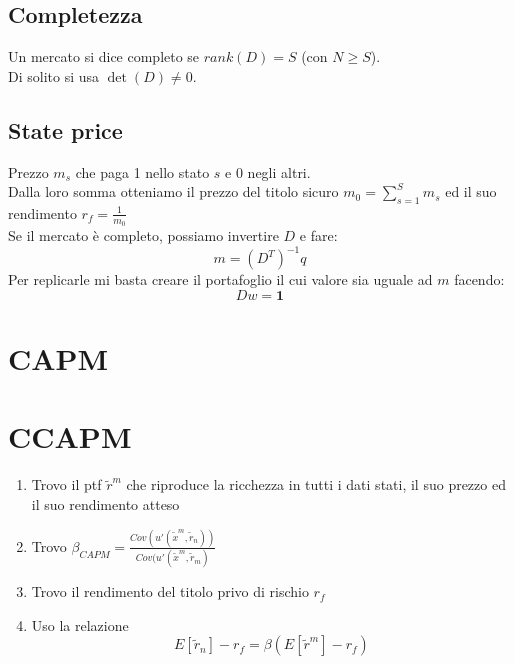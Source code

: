 \documentclass[a4paper,notitlepage]{report}%
\begin{document}
\begin{multicols*}{2}
    \subsection*{Completezza}
        Un mercato si dice completo se $rank(D)=S$ (con $N\geq S$).\\
        Di solito si usa $\det(D)\neq0$.

    \subsection*{State price}
    Prezzo $m_s$ che paga 1 nello stato $s$ e 0 negli altri.\\
    Dalla loro somma otteniamo il prezzo del titolo sicuro $m_0 = {\sum_{s=1}^S m_s}$
    ed il suo rendimento $r_f = \frac{1}{m_0}$\\
    Se il mercato è completo, possiamo invertire $D$ e fare:
    \[
        m=(D^T)^{-1} q   
    \]
    Per replicarle mi basta creare il portafoglio
    il cui valore sia uguale ad $m$ facendo:
    \[
        Dw=\mathbf{1}   
    \]


\section*{CAPM}



\section*{CCAPM}
    \begin{enumerate}
        \item Trovo il ptf $\tilde{r}^m$ che riproduce la ricchezza in tutti i dati stati, il suo prezzo ed il suo rendimento atteso
        \item Trovo $\beta_{CAPM} = \frac{Cov(u'(\tilde{x}^m,\tilde{r}_n))}{Cov(u'(\tilde{x}^m,\tilde{r}_m)}$
        \item Trovo il rendimento del titolo privo di rischio $r_f$
        \item Uso la relazione \[
                E[\tilde{r}_n]-r_f = \beta (E[\tilde{r}^m]-r_f) 
            \]
    \end{enumerate}


\blindtext[4]
    
\end{multicols*}
\end{document}
